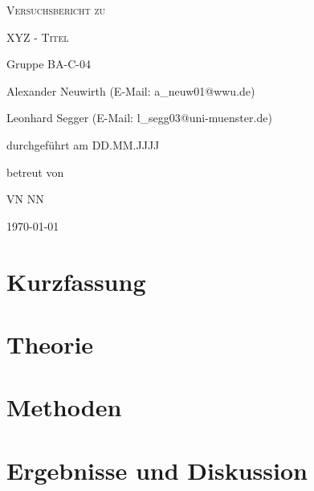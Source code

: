\documentclass[
	a4paper,
	12pt,
	pagesize,
	ngerman
]{scrartcl}
\begin{document}
	\begin{titlepage}
		\centering
		{\scshape\LARGE Versuchsbericht zu \par}
		\vspace{1cm}
		{\scshape\huge XYZ - Titel \par} %
		\vspace{2.5cm}
		{\LARGE Gruppe BA-C-04 \par}
		\vspace{0.5cm}

		{\large Alexander Neuwirth (E-Mail: a\_neuw01@wwu.de) \par}
		{\large Leonhard Segger (E-Mail: l\_segg03@uni-muenster.de) \par}
		\vfill

		durchgeführt am DD.MM.JJJJ\par %
		betreut von\par
		{\large VN NN} %

		\vfill

		{\large \today\par}
	\end{titlepage}
	\tableofcontents
	\newpage


	\section{Kurzfassung}

  \section{Theorie}
	
	\section{Methoden}

	\section{Ergebnisse und Diskussion}
\end{document}
